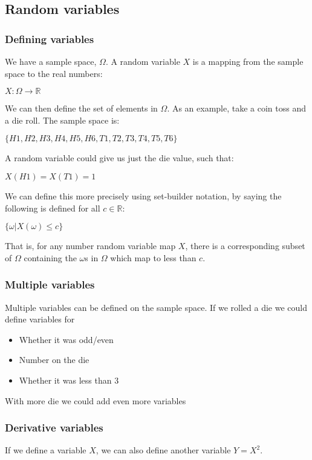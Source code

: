 
\subsection{Random variables}

\subsubsection{Defining variables}

We have a sample space, \(\Omega \). A random variable \(X\) is a mapping from the sample space to the real numbers:

$X: \Omega \rightarrow \mathbb{R}$

We can then define the set of elements in \(\Omega \). As an example, take a coin toss and a die roll. The sample space is:

$\{H1,H2,H3,H4,H5,H6,T1,T2,T3,T4,T5,T6\}$

A random variable could give us just the die value, such that:

$X(H1)=X(T1)=1$

We can define this more precisely using set-builder notation, by saying the following is defined for all	 \(c\in \mathbb{R}\):

$\{\omega |X(\omega )\le c\}$

That is, for any number random variable map \(X\), there is a corresponding subset of \(\Omega \) containing the \(\omega \)s in \(\Omega \) which map to less than \(c\).

\subsubsection{Multiple variables}

Multiple variables can be defined on the sample space. If we rolled a die we could define variables for

\begin{itemize}
\item Whether it was odd/even
\item Number on the die
\item Whether it was less than 3
\end{itemize}

With more die we could add even more variables

\subsubsection{Derivative variables}

If we define a variable \(X\), we can also define another variable \(Y=X^2\).

